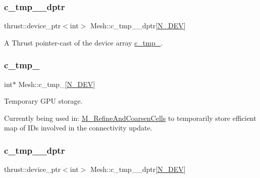 \subsubsection{\texorpdfstring{c\+\_\+tmp\+\_\+\_\+dptr}{c\_tmp\_7\_dptr}}
{\footnotesize\ttfamily thrust\+::device\+\_\+ptr$<$int$>$ Mesh\+::c\+\_\+tmp\+\_\+\_\+dptr\mbox{[}\hyperlink{cppspec_8h_a2b674dab7a14f1bf32b48b7fda5022dc}{N\+\_\+\+D\+EV}\mbox{]}\hspace{0.3cm}{\ttfamily [private]}}



A Thrust pointer-\/cast of the device array \hyperlink{classMesh_ad6e01f4bf87d025aa407a79fedbf73fd}{c\+\_\+tmp\+\_}. 

\mbox{\label{classMesh_af5270c410a5690f1763f5d593d0c9e35}} 
\subsubsection{\texorpdfstring{c\+\_\+tmp\+\_}{c\_tmp\_8}}
{\footnotesize\ttfamily int$\ast$ Mesh\+::c\+\_\+tmp\+\_\mbox{[}\hyperlink{cppspec_8h_a2b674dab7a14f1bf32b48b7fda5022dc}{N\+\_\+\+D\+EV}\mbox{]}\hspace{0.3cm}{\ttfamily [private]}}



Temporary G\+PU storage. 

Currently being used in\+: \hyperlink{classMesh_a7f1c861db5b8168cff9dabf728c0ce1a}{M\+\_\+\+Refine\+And\+Coarsen\+Cells} to temporarily store \textquotesingle{}efficient\textquotesingle{} map of I\+Ds involved in the connectivity update. \mbox{\label{classMesh_a7f6a6fff767faf0cb67ab9d1cc7e478a}} 
\subsubsection{\texorpdfstring{c\+\_\+tmp\+\_\+\_\+dptr}{c\_tmp\_8\_dptr}}
{\footnotesize\ttfamily thrust\+::device\+\_\+ptr$<$int$>$ Mesh\+::c\+\_\+tmp\+\_\+\_\+dptr\mbox{[}\hyperlink{cppspec_8h_a2b674dab7a14f1bf32b48b7fda5022dc}{N\+\_\+\+D\+EV}\mbox{]}\hspace{0.3cm}{\ttfamily [private]}}



